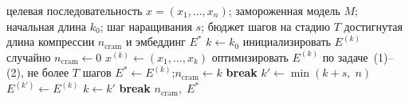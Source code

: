 \begin{algorithm}[H]
\caption{Прогрессивная компрессия (progressive cramming)}
\label{alg:progressive}
\begin{algorithmic}[1]
\Require целевая последовательность $x = (x_1, \dots, x_n)$;
         замороженная модель $M$;
         начальная длина $k_0$;
         шаг наращивания $s$;
         бюджет шагов на стадию $T$
\Ensure достигнутая длина компрессии $n_{\mathrm{cram}}$ и эмбеддинг $E^*$
\State $k \gets k_0$
\State инициализировать $E^{(k)}$ случайно
\State $n_{\mathrm{cram}} \gets 0$
\Loop
    \State $x^{(k)} \gets (x_1, \dots, x_k)$
    \State оптимизировать $E^{(k)}$ по задаче~(1)--(2), не более $T$ шагов
        \State $E^* \gets E^{(k)}$;\quad $n_{\mathrm{cram}} \gets k$
            \State \textbf{break}
        \EndIf
        \State $k' \gets \min(k + s,\; n)$
        \State $E^{(k')} \gets E^{(k)}$
        \State $k \gets k'$
    \Else
        \State \textbf{break}
    \EndIf
\EndLoop
\State \Return $n_{\mathrm{cram}},\; E^*$
\end{algorithmic}
\end{algorithm}